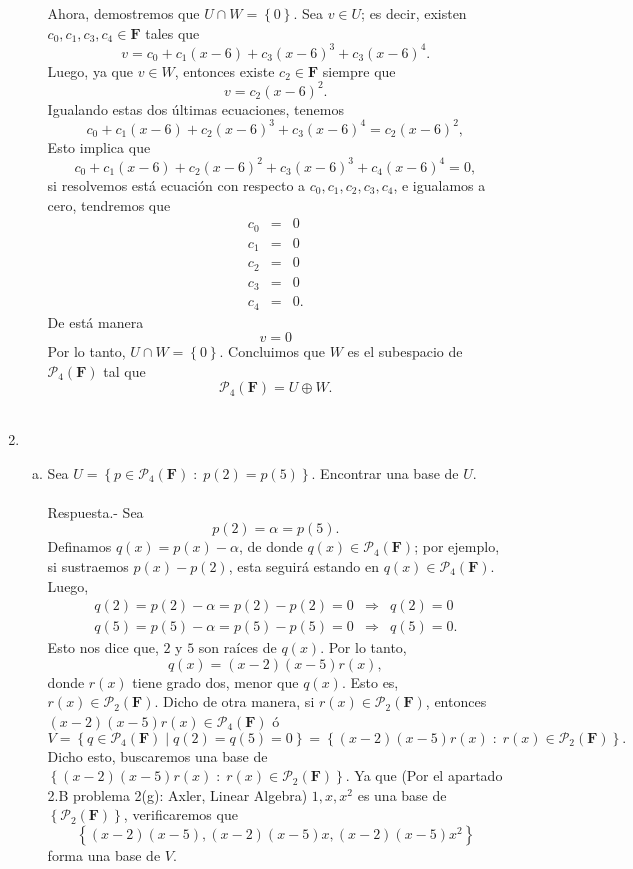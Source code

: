\begin{enumerate}[\bfseries 1.]
\begin{enumerate}[(a)]
		Ahora, demostremos que $U\cap W=\left\{0\right\}.$ Sea $v\in U$; es decir, existen $c_0,c_1,c_3,c_4\in \textbf{F}$ tales que
		$$v=c_0+c_1(x-6)+c_3(x-6)^3+c_3(x-6)^4.$$
		Luego, ya que $v\in W$, entonces existe $c_2\in \textbf{F}$ siempre que
		$$v=c_2(x-6)^2.$$
		Igualando estas dos últimas ecuaciones, tenemos
		$$c_0+c_1(x-6)+c_2(x-6)^3+c_3(x-6)^4=c_2(x-6)^2,$$
		Esto implica que
		$$c_0+c_1(x-6)+c_2(x-6)^2+c_3(x-6)^3+c_4(x-6)^4=0,$$
		si resolvemos está ecuación con respecto a $c_0,c_1,c_2,c_3,c_4$, e igualamos a cero, tendremos que
		$$
		\begin{array}{rcl}
		    c_0&=&0\\
		    c_1&=&0\\
		    c_2&=&0\\
		    c_3&=&0\\
		    c_4&=&0.
		\end{array}
		$$
		De está manera 
		$$v=0$$
		Por lo tanto, $U\cap W=\left\{0\right\}$. Concluimos que $W$ es el subespacio de $\mathcal{P}_4(\textbf{F})$ tal que 
		$$\mathcal{P}_4(\textbf{F})=U\oplus W.$$\\

	\end{enumerate}

    \item 
	\begin{enumerate}[(a)]

	    \item Sea $U=\left\{p\in \mathcal{P}_4(\textbf{F})\; : \; p(2)=p(5)\right\}$. Encontrar una base de $U$.\\\\
		Respuesta.-\; Sea 
		$$p(2)=\alpha=p(5).$$
		Definamos $q(x)=p(x)-\alpha$, de donde $q(x)\in \mathcal{P}_4(\textbf{F})$; por ejemplo, si sustraemos $p(x)-p(2)$, esta seguirá estando en $q(x)\in \mathcal{P}_4(\textbf{F})$. Luego,
		$$
		\begin{array}{rcl}
		    q(2)=p(2)-\alpha=p(2)-p(2)=0&\Rightarrow&q(2)=0\\
		    q(5)=p(5)-\alpha=p(5)-p(5)=0&\Rightarrow&q(5)=0.
		\end{array}
		$$
		Esto nos dice que, $2$ y $5$ son raíces de $q(x)$. Por lo tanto,
		$$q(x)=\left(x-2\right)\left(x-5\right)r(x),$$
		donde $r(x)$ tiene grado dos, menor que $q(x)$. Esto es, $r(x)\in \mathcal{P}_2(\textbf{F}).$ Dicho de otra manera, si $r(x)\in \mathcal{P}_2(\textbf{F})$, entonces $(x-2)(x-5)r(x)\in \mathcal{P}_4(\textbf{F})$ ó
		$$V=\left\{q\in \mathcal{P}_4(\textbf{F}) \; |\; q(2)=q(5)=0\right\}=\left\{(x-2)(x-5)r(x)\; : \; r(x)\in \mathcal{P}_2(\textbf{F})\right\}.$$
		Dicho esto, buscaremos una base de $\left\{(x-2)(x-5)r(x)\; : \; r(x)\in \mathcal{P}_2(\textbf{F})\right\}$. Ya que (Por el apartado 2.B problema 2(g): Axler, Linear Algebra) $1,x,x^2$ es una base de $\left\{\mathcal{P}_2(\textbf{F})\right\}$, verificaremos que 
		$$\left\{(x-2)(x-5),(x-2)(x-5)x,(x-2)(x-5)x^2\right\}$$
		forma una base de $V$.\\


\end{enumerate}
\end{enumerate}
